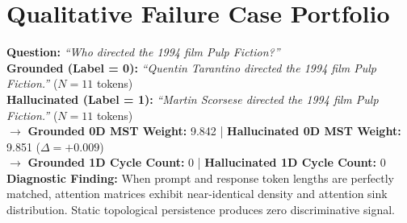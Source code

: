 \documentclass{article}
\begin{document}
\section{Qualitative Failure Case Portfolio}
\label{app:cases}

\begin{tcolorbox}[colback=blue!3!white,colframe=blue!60!black,title=\textbf{Case 1: Entity Name Substitution with Identical Length (HaluEval QA)},fonttitle=\bfseries\small,breakable]
\small
\textbf{Question:} \textit{``Who directed the 1994 film Pulp Fiction?''} \\
\textbf{Grounded (Label = 0):} \textit{``Quentin Tarantino directed the 1994 film Pulp Fiction.''} ($N=11$ tokens) \\
\textbf{Hallucinated (Label = 1):} \textit{``Martin Scorsese directed the 1994 film Pulp Fiction.''} ($N=11$ tokens) \\
\tcbline
$\rightarrow$ \textbf{Grounded 0D MST Weight:} 9.842 \quad | \quad \textbf{Hallucinated 0D MST Weight:} 9.851 ($\Delta = +0.009$) \\
$\rightarrow$ \textbf{Grounded 1D Cycle Count:} 0 \quad | \quad \textbf{Hallucinated 1D Cycle Count:} 0 \\
\textbf{Diagnostic Finding:} When prompt and response token lengths are perfectly matched, attention matrices exhibit near-identical density and attention sink distribution. Static topological persistence produces zero discriminative signal.
\end{tcolorbox}
\end{document}

